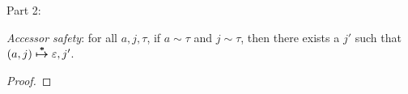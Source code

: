 \documentclass[11pt]{article}
\newcommand{\matches}[2]{{#1}\sim{#2}}   %
\newcommand{\aeps}{\varepsilon}          %
\begin{document}
Part 2:

\begin{mathpar}
\end{mathpar}

\textit{Accessor safety}: for all $a, j, \tau$, if $\matches{a}{\tau}$ and $\matches{j}{\tau}$, then there exists a $j'$ such that $\evals{(a, j)}{\aeps, j'}$.

\begin{proof}
\end{proof}
\end{document}
